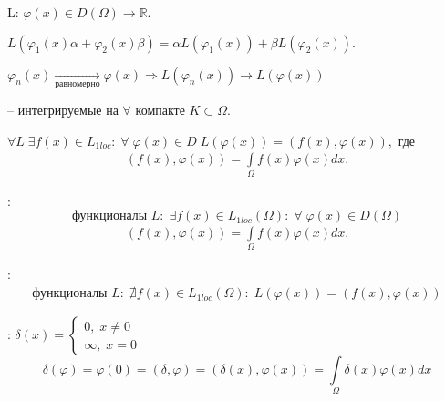 \begin{definition}
	 L: $ \varphi(x) \in D(\Omega) \to \mathbb{R}. $
\end{definition}

\begin{definition}
	 $ L(\varphi_1(x)\alpha + \varphi_2(x)\beta) = \alpha L(\varphi_1(x)) + \beta L(\varphi_2(x)).$
\end{definition}

\begin{definition}
	 $ \varphi_n(x) \underset{\text{равномерно}}{\longrightarrow} \varphi(x) \Longrightarrow L(\varphi_n(x)) \longrightarrow L(\varphi(x))$
\end{definition}

\begin{definition}
	 -- интегрируемые на $ \forall $ компакте $K \subset \Omega. $
\end{definition}

\begin{theorem}
	$ \forall L \; \exists f(x) \in L_{1loc}: \; \forall \; \varphi(x) \in D \; L(\varphi(x)) = (f(x), \varphi(x)), $ где
	$$\begin{gathered}
		(f(x), \varphi(x)) = \int\limits_{\Omega} f(x)\varphi(x)dx.
	\end{gathered}$$
\end{theorem}

\begin{definition}
	: 
	$$\text{функционалы } L: \; \exists f(x) \in  L_{1loc}(\Omega): \; \forall \; \varphi(x)\in D(\Omega)$$
	$$\begin{gathered}
		(f(x), \varphi(x)) = \int\limits_{\Omega} f(x)\varphi(x)dx.
	\end{gathered}$$
\end{definition}

\begin{definition}
	: 
	$$\begin{gathered}
		\text{функционалы } L: \; \nexists f(x) \in  L_{1loc}(\Omega): \; L(\varphi(x)) = (f(x), \varphi(x))
	\end{gathered}$$
\end{definition}

\begin{definition}
	: 
	$\delta(x) =
	\begin{cases}
		0, \; x \neq 0\\
		\infty, \; x = 0
	\end{cases}$
	$$\delta(\varphi) = \varphi(0) = (\delta, \varphi) = (\delta(x), \varphi(x)) =  \int\limits_{\Omega} \delta(x)\varphi(x)dx$$
\end{definition}

